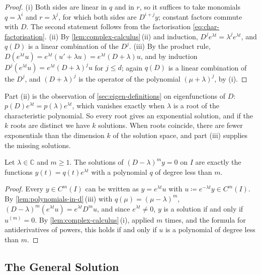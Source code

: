 \begin{proof}
(i) Both sides are linear in $q$ and in $r$, so it suffices to take monomials $q=\lambda^i$ and $r=\lambda^j$, for which both sides are $D^{i+j}y$; constant factors commute with $D$. The second statement follows from the factorisation \eqref{eq:char-factorisation}. (ii) By \cref{lem:complex-calculus}\,(ii) and induction, $D^je^{\lambda t}=\lambda^je^{\lambda t}$, and $q(D)$ is a linear combination of the $D^j$. (iii) By the product rule, $D(e^{\lambda t}u)=e^{\lambda t}(u'+\lambda u)=e^{\lambda t}(D+\lambda)u$, and by induction $D^j(e^{\lambda t}u)=e^{\lambda t}(D+\lambda)^ju$ for $j\le d$; again $q(D)$ is a linear combination of the $D^j$, and $(D+\lambda)^j$ is the operator of the polynomial $(\mu+\lambda)^j$, by (i).
\end{proof}

Part (ii) is the observation of \cref{sec:eigen-definitions} on eigenfunctions of $D$: $p(D)e^{\lambda t}=p(\lambda)e^{\lambda t}$, which vanishes exactly when $\lambda$ is a root of the characteristic polynomial. So every root gives an exponential solution, and if the $k$ roots are distinct we have $k$ solutions. When roots coincide, there are fewer exponentials than the dimension $k$ of the solution space, and part (iii) supplies the missing solutions.

\begin{proposition}
\label{prop:kernel-power}
Let $\lambda\in\mathbb C$ and $m\ge1$. The solutions of $(D-\lambda)^my=0$ on $I$ are exactly the functions $y(t)=q(t)e^{\lambda t}$ with a polynomial $q$ of degree less than $m$.
\end{proposition}

\begin{proof}
Every $y\in C^m(I)$ can be written as $y=e^{\lambda t}u$ with $u\coloneqq e^{-\lambda t}y\in C^m(I)$. By \cref{lem:polynomials-in-d}\,(iii) with $q(\mu)=(\mu-\lambda)^m$, $(D-\lambda)^m(e^{\lambda t}u)=e^{\lambda t}D^mu$, and since $e^{\lambda t}\ne0$, $y$ is a solution if and only if $u^{(m)}=0$. By \cref{lem:complex-calculus}\,(i), applied $m$ times, and the formula for antiderivatives of powers, this holds if and only if $u$ is a polynomial of degree less than $m$.
\end{proof}

\subsection{The General Solution}

